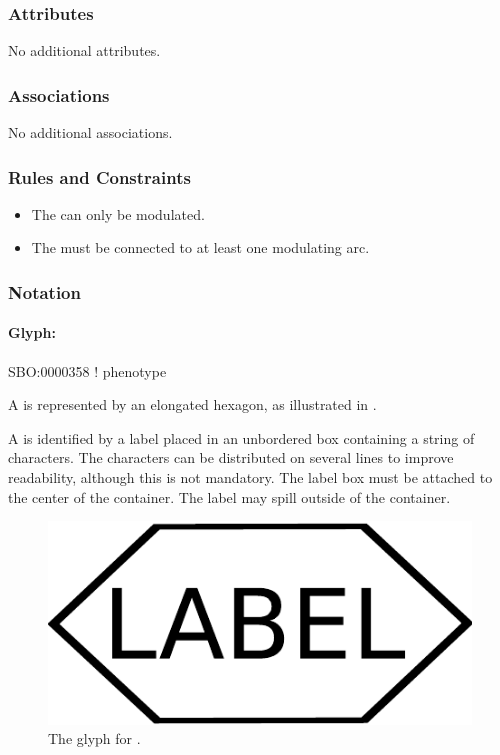 \subsubsection{Attributes}

No additional attributes.

\subsubsection{Associations}

No additional associations.

\subsubsection{Rules and Constraints}

\begin{itemize}
\item The  can only be modulated.
\item The  must be connected to at least one
  modulating arc.
\end{itemize}

\subsubsection{Notation}

\paragraph{Glyph: }
\label{sec:phenotype}

\begin{glyphDescription}

\glyphSboTerm SBO:0000358 ! phenotype

\glyphContainer A  is represented by an elongated
hexagon, as illustrated in .

\glyphLabel A  is identified by a label placed in an
unbordered box containing a string of characters.  The characters can be
distributed on several lines to improve readability, although this is not
mandatory.  The label box must be attached to the center of the
 container.  The label may spill outside of the container.
\end{glyphDescription}
 
\begin{figure}[H]
  \centering
  \includegraphics[scale = 0.3]{images/phenotype}
  \caption{The \PD glyph for .}
  \label{fig:phenotype}
\end{figure}



